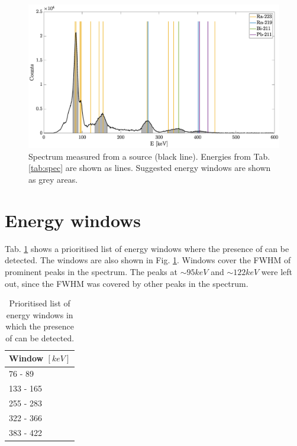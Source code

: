 \documentclass[a4paper,article]{memoir}
\begin{document}
\begin{figure}[h]
    \centering
    \includegraphics[width=\textwidth]{raspec_fwhm.eps}
    \caption{Spectrum measured from a  source (black line). 
    Energies from Tab. \ref{tab:spec} are shown as lines. Suggested energy 
    windows are shown as grey areas.}
    \label{fig:spec}
\end{figure}


\section*{Energy windows}

Tab. \ref{tab:windows} shows a prioritised list of energy windows where the 
presence of  can be detected. The windows are also shown in 
Fig. \ref{fig:spec}. Windows cover the FWHM of prominent peaks in the spectrum. 
The peaks at $\sim 95\si{keV}$ and $\sim 122\si{keV}$ were left out, since 
the FWHM was covered by other peaks in the spectrum.

\begin{table}[h]
	\centering
	\begin{tabular}{@{}l@{}}
		\toprule
		Window $[\si{keV}]$  \\ \midrule
		76 - 89                          \\
		133 - 165                         \\
		255 - 283                         \\
		322 - 366                        \\
		383 - 422                      \\ \bottomrule
	\end{tabular}
	\caption{Prioritised list of energy windows in which the presence of 
	 can be detected.}
	\label{tab:windows}
\end{table}
\end{document}
